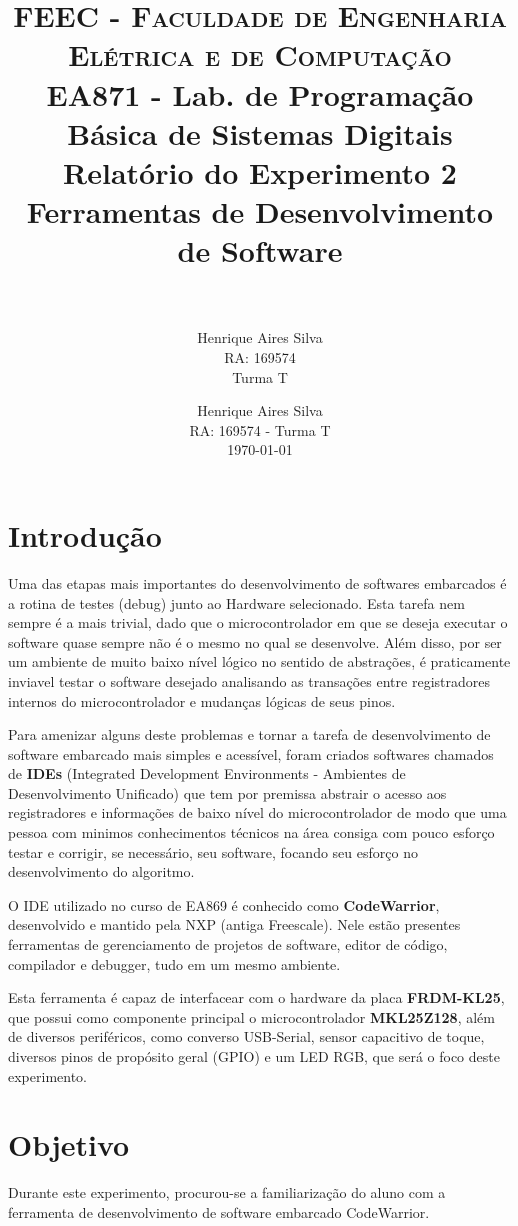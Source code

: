 \documentclass{article}
\author{Henrique Aires Silva \\RA: 169574 \\ Turma T}
\title{
  \usefont{OT1}{bch}{b}{n}
  \normalfont \normalsize \textsc{FEEC - Faculdade de Engenharia Elétrica e de Computação} \\
  \normalfont \normalsize EA871 - Lab. de Programação Básica de Sistemas Digitais
  \horrule{0.5pt} \\[1.0cm]
  \LARGE \textbf{Relatório do Experimento 2\\Ferramentas de Desenvolvimento de Software} \\[1.0cm]
  \horrule{2pt} \\[0.1cm]
}
\author{
  \normalfont 								\normalsize
  Henrique Aires Silva\\ \normalfont \normalsize RA: 169574 - Turma T\\[-3pt]		\normalsize
  \today
}
\date{}
\begin{document}
\maketitle

\section{Introdução}
Uma das etapas mais importantes do desenvolvimento de softwares embarcados é a rotina de testes (debug) junto ao Hardware selecionado. Esta tarefa nem sempre é a mais trivial, dado que o microcontrolador em que se deseja executar o software quase sempre não é o mesmo no qual se desenvolve. Além disso, por ser um ambiente de muito baixo nível lógico no sentido de abstrações, é praticamente inviavel testar o software desejado analisando as transações entre registradores internos do microcontrolador e mudanças lógicas de seus pinos.

Para amenizar alguns deste problemas e tornar a tarefa de desenvolvimento de software embarcado mais simples e acessível, foram criados softwares chamados de \textbf{IDEs} (Integrated Development Environments - Ambientes de Desenvolvimento Unificado) que tem por premissa abstrair o acesso aos registradores e informações de baixo nível do microcontrolador de modo que uma pessoa com minimos conhecimentos técnicos na área consiga com pouco esforço testar e corrigir, se necessário, seu software, focando seu esforço no desenvolvimento do algoritmo.

O IDE utilizado no curso de EA869 é conhecido como \textbf{CodeWarrior}\cite{code-warrior}, desenvolvido e mantido pela NXP (antiga Freescale). Nele estão presentes ferramentas de gerenciamento de projetos de software, editor de código, compilador e debugger, tudo em um mesmo ambiente.

Esta ferramenta é capaz de interfacear com o hardware da placa \textbf{FRDM-KL25}\cite{manual-frdm}, que possui como componente principal o microcontrolador \textbf{MKL25Z128}\cite{manual-mic}, além de diversos periféricos, como converso USB-Serial, sensor capacitivo de toque, diversos pinos de propósito geral (GPIO) e um LED RGB, que será o foco deste experimento.

\section{Objetivo}

Durante este experimento, procurou-se a familiarização do aluno com a ferramenta de desenvolvimento de software embarcado CodeWarrior.
\end{document}
